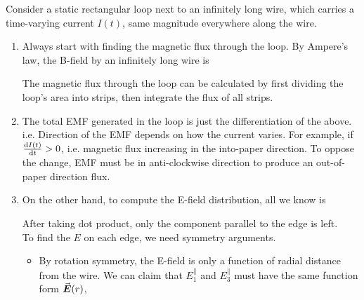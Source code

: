 \documentclass[class=article, crop=false, 12pt]{standalone}
\begin{document}
\begin{example}
    Consider a static rectangular loop next to an infinitely long wire, 
    which carries a time-varying current $I(t)$, same magnitude everywhere along the wire. 


    \begin{enumerate}
        \item Always start with finding the magnetic flux through the loop.
        By Ampere's law, the B-field by an infinitely long wire is 
        
        The magnetic flux through the loop can be calculated by 
        first dividing the loop's area into strips,
        then integrate the flux of all strips.


        \item The total EMF generated in the loop is just the differentiation of the above. i.e.
        Direction of the EMF depends on how the current varies.
        For example, if $\dv{I(t)}{t}>0$, i.e. magnetic flux increasing in the into-paper direction.
        To oppose the change, EMF must be in anti-clockwise direction
        to produce an out-of-paper direction flux.

        \item On the other hand, to compute the E-field distribution, all we know is 

        
        After taking dot product, only the component parallel to the edge is left.\\

        To find the $E$ on each edge, we need symmetry arguments.
        \begin{itemize}
            \item By rotation symmetry, 
            the E-field is only a function of radial distance from the wire. 
            We can claim that $E^\parallel_1$ and $E^\parallel_3$ must have the same function form $\va*{E}(r)$,
            

\end{itemize}
\end{enumerate}
\end{example}
\end{document}
